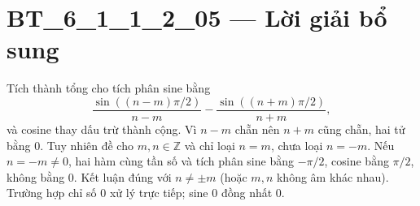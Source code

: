 \documentclass[10pt,a4paper]{article}
\begin{document}
\section*{BT\_6\_1\_1\_2\_05 — Lời giải bổ sung}
Tích thành tổng cho tích phân sine bằng
\[\frac{\sin((n-m)\pi/2)}{n-m}-\frac{\sin((n+m)\pi/2)}{n+m},\]
và cosine thay dấu trừ thành cộng. Vì $n-m$ chẵn nên $n+m$ cũng chẵn, hai tử bằng 0. Tuy nhiên đề cho $m,n\in\mathbb Z$ và chỉ loại $n=m$, chưa loại $n=-m$. Nếu $n=-m\ne0$, hai hàm cùng tần số và tích phân sine bằng $-\pi/2$, cosine bằng $\pi/2$, không bằng 0. Kết luận đúng với $n\ne\pm m$ (hoặc $m,n$ không âm khác nhau). Trường hợp chỉ số 0 xử lý trực tiếp; sine 0 đồng nhất 0.
\end{document}
